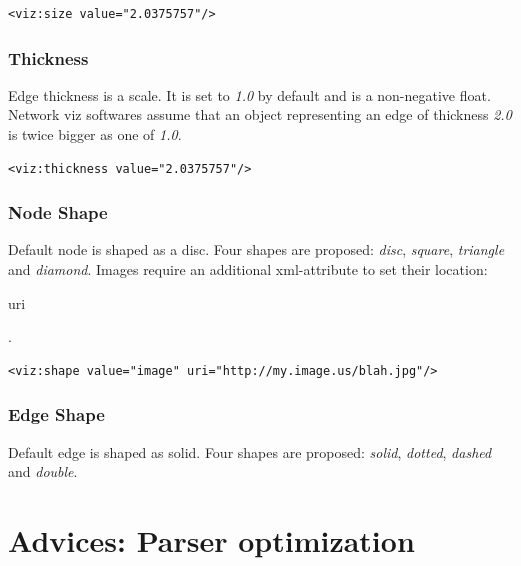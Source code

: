 \documentclass[a4paper,10pt]{article}
\begin{document}
\lstset{ style=gexf }
\begin{lstlisting}[caption={VIZ Size Declaration},label=vizsize]
<viz:size value="2.0375757"/>
\end{lstlisting}

\subsubsection{Thickness}

Edge thickness is a scale. It is set to \textit{1.0} by default and is a non-negative float. Network viz softwares assume that an object representing an edge of thickness \textit{2.0} is twice bigger as one of \textit{1.0}.

\lstset{ style=gexf }
\begin{lstlisting}[caption={VIZ Thickness Declaration},label=vizthickness]
<viz:thickness value="2.0375757"/>
\end{lstlisting}

\subsubsection{Node Shape}

Default node is shaped as a disc. Four shapes are proposed: \textit{disc}, \textit{square}, \textit{triangle} and \textit{diamond}. Images require an additional xml-attribute to set their location: \begin{footnotesize}uri\end{footnotesize}.

\lstset{ style=gexf }
\begin{lstlisting}[caption={Image Declaration},label=vizimage]
<viz:shape value="image" uri="http://my.image.us/blah.jpg"/>
\end{lstlisting}

\subsubsection{Edge Shape}

Default edge is shaped as solid. Four shapes are proposed: \textit{solid}, \textit{dotted}, \textit{dashed} and \textit{double}.

\section{Advices: Parser optimization} \label{advices}
\end{document}
